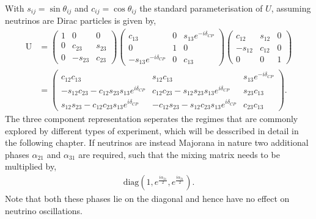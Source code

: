 With $s_{ij}=\sin \theta_{ij}$ and $c_{ij}=\cos \theta_{ij}$ the standard parameterisation of
$U$, assuming neutrinos are Dirac particles is given by,
\begin{align} %
    \mathrm{U} & =
    \begin{pmatrix}
        1 & 0       & 0      \\
        0 & c_{23}  & s_{23} \\
        0 & -s_{23} & c_{23}
    \end{pmatrix}
    \begin{pmatrix}
        c_{13}                   & 0 & s_{13}e^{-i\delta_{CP}} \\
        0                        & 1 & 0                       \\
        -s_{13}e^{-i\delta_{CP}} & 0 & c_{13}
    \end{pmatrix}
    \begin{pmatrix}
        c_{12}  & s_{12} & 0 \\
        -s_{12} & c_{12} & 0 \\
        0       & 0      & 1
    \end{pmatrix}
    \\
               & =
    \begin{pmatrix}
        c_{12}c_{13}
         & s_{12}c_{13}
         & s_{13}e^{-i\delta_{CP}}                          \\
        -s_{12}c_{23}-c_{12}s_{23}s_{13}e^{i\delta_{CP}}
         & c_{12}c_{23}-s_{12}s_{23}s_{13}e^{i\delta_{CP}}
         & s_{23}c_{13}                                     \\
        s_{12}s_{23}-c_{12}c_{23}s_{13}e^{i\delta_{CP}}
         & -c_{12}s_{23}-s_{12}c_{23}s_{13}e^{i\delta_{CP}}
         & c_{23}c_{13}
    \end{pmatrix}.
\end{align} %
The three component representation seperates the regimes that are commonly explored by different
types of experiment, which will be desscribed in detail in the following chapter. If neutrinos are
instead Majorana in nature two additional phases $\alpha_{21}$ and $\alpha_{31}$ are required,
such that the mixing matrix needs to be multiplied by,
\begin{align} %
    \mathrm{diag}(1, e^{\frac{i\alpha_{21}}{2}}, e^{\frac{i\alpha_{31}}{2}}).
\end{align} %
Note that both these phases lie on the diagonal and hence have no effect on neutrino oscillations.

